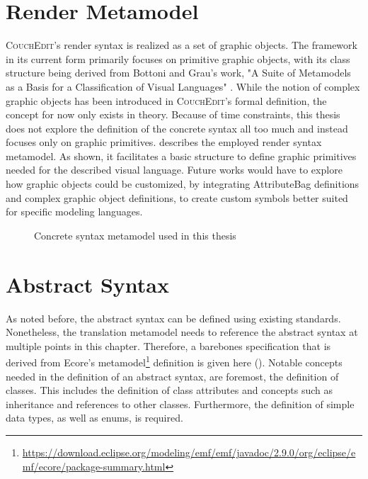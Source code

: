 \section{Render Metamodel}
\textsc{CouchEdit}'s render syntax is realized as a set of graphic objects. The framework in its current form primarily focuses on primitive graphic objects, with its class structure being derived from Bottoni and Grau's work, "A Suite of Metamodels as a Basis for a Classification of Visual Languages" \cite{nachreiner_couchedit_2020, bottoni_suite_2004}. While the notion of complex graphic objects has been introduced in \textsc{CouchEdit}'s formal definition, the concept for now only exists in theory. Because of time constraints, this thesis does not explore the definition of the concrete syntax all too much and instead focuses only on graphic primitives.  describes the employed render syntax metamodel. As shown, it facilitates a basic structure to define graphic primitives needed for the described visual language. Future works would have to explore how graphic objects could be customized, by integrating AttributeBag definitions and complex graphic object definitions, to create custom symbols better suited for specific modeling languages.

\begin{figure}[h]
  \centering
  
  \caption{Concrete syntax metamodel used in this thesis}
  \label{fig:concretesyntax}
\end{figure}


\section{Abstract Syntax}
\label{sec:abstract-syntax}
As noted before, the abstract syntax can be defined using existing standards. Nonetheless, the translation metamodel needs to reference the abstract syntax at multiple points in this chapter. Therefore, a barebones specification that is derived from Ecore's metamodel\footnote{\url{https://download.eclipse.org/modeling/emf/emf/javadoc/2.9.0/org/eclipse/emf/ecore/package-summary.html}} definition is given here (). Notable concepts needed in the definition of an abstract syntax, are foremost, the definition of classes. This includes the definition of class attributes and concepts such as inheritance and references to other classes. Furthermore, the definition of simple data types, as well as enums, is required.

